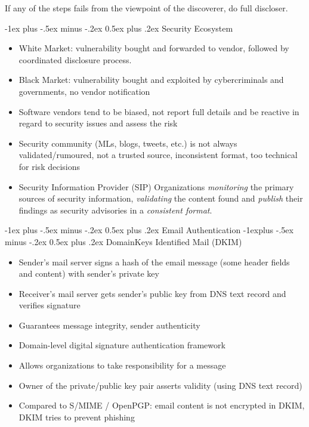 \documentclass[a4paper,twocolumn]{article}
\makeatletter
\newenvironment{itemization}[1][\small]{%
    \begin{itemize}[leftmargin=*]
            #1
        }{%
    \end{itemize}
}
\renewcommand{\section}{%
    \@startsection{section}{1}{0mm}%
    {-1ex plus -.5ex minus -.2ex}%
    {0.5ex plus .2ex}%
    {\normalfont\normalsize\bfseries\sectionrule{12pt}{0.4pt}{0pt}{0pt}}
}
\renewcommand{\subsection}{%
    \@startsection{subsection}{2}{0mm}%
    {-1explus -.5ex minus -.2ex}%
    {0.5ex plus .2ex}%
    {\normalfont\small\bfseries}
}
\makeatother
\begin{document}
\begin{footnotesize}
If any of the steps fails from the viewpoint of the discoverer, do full discloser.

\section{Security Ecosystem}
\begin{itemization}
\item White Market: vulnerability bought and forwarded to vendor, followed by coordinated disclosure process.
\item Black Market: vulnerability bought and exploited by cybercriminals and governments, no vendor notification
\item Software vendors tend to be biased, not report full details and be reactive in regard to security issues and assess the risk
\item Security community (MLs, blogs, tweets, etc.) is not always validated/rumoured, not a trusted source, inconsistent format, too technical for risk decisions
\item Security Information Provider (SIP) Organizations \textit{monitoring} the primary sources of security information, \textit{validating} the content found and \textit{publish} their findings as security advisories in a \textit{consistent format}.
\end{itemization}

\section{Email Authentication}
\subsection{DomainKeys Identified Mail (DKIM)}
\begin{itemization}
\item Sender's mail server signs a hash of the email message (some header fields and content) with sender's private key
\item Receiver's mail server gets sender's public key from DNS text record and verifies signature
\item Guarantees message integrity, sender authenticity
\item Domain-level digital signature authentication framework
\item Allows organizations to take responsibility for a message
\item Owner of the private/public key pair asserts validity (using DNS text record)
\item Compared to S/MIME / OpenPGP: email content is not encrypted in DKIM, DKIM tries to prevent phishing
\end{itemization}


\end{footnotesize}
\end{document}
